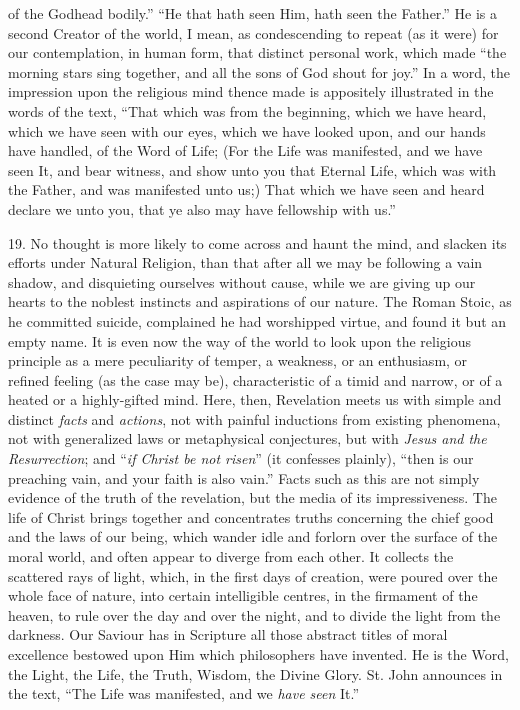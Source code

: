 of the Godhead bodily.'' ``He that hath seen Him, hath seen
the Father.'' He is a second Creator of the world, I mean, as
condescending to repeat (as it were) for our contemplation, in human
form, that distinct personal work, which made ``the morning stars
sing together, and all the sons of God shout for joy.'' In a word,
the impression upon the religious mind thence made is appositely
illustrated in the words of the text, ``That which was from the
beginning, which we have heard, which we have seen with our eyes,
which we have looked upon, and our hands have handled, of the Word of
Life; (For the Life was manifested, and we have seen It, and bear
witness, and show unto you that Eternal Life, which was with the
Father, and was manifested unto us;) That which we have seen and heard
declare we unto you, that ye also may have fellowship with us.''

19. No thought is more likely to come across and haunt the mind,
and slacken its efforts under Natural Religion, than that after all we
may be following a vain shadow, and disquieting ourselves without
cause, while we are giving up our hearts to the noblest instincts and
aspirations of our nature. The Roman Stoic, as he committed suicide,
complained he had worshipped virtue, and found it but an empty name.
It is even now the way of the world to look upon the religious
principle as a mere peculiarity of temper, a weakness, or an
enthusiasm, or refined feeling (as the case may be), characteristic of
a timid and narrow, or of a heated or a highly-gifted mind. Here,
then, Revelation meets us with simple and distinct \emph{facts} and \emph{actions},
not with painful inductions from existing phenomena, not with
generalized laws or metaphysical conjectures, but with \emph{Jesus and
the Resurrection}; and ``\emph{if Christ be not risen}''
(it confesses plainly), ``then is our preaching vain, and your
faith is also vain.'' Facts such as this are not simply evidence
of the truth of the revelation, but the media of its impressiveness.
The life of Christ brings together and concentrates truths concerning
the chief good and the laws of our being, which wander idle and
forlorn over the surface of the moral world, and often appear to
diverge from each other. It collects the scattered rays of light,
which, in the first days of creation, were poured over the whole face
of nature, into certain intelligible centres, in the firmament of the
heaven, to rule over the day and over the night, and to divide the
light from the darkness. Our Saviour has in Scripture all those
abstract titles of moral excellence bestowed upon Him which
philosophers have invented. He is the Word, the Light, the Life, the
Truth, Wisdom, the Divine Glory. St. John announces in the text,
``The Life was manifested, and we \emph{have seen} It.''

